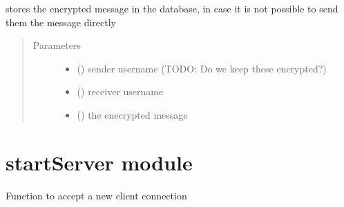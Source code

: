 \documentclass[letterpaper,10pt,english]{sphinxmanual}
\begin{document}
\begin{fulllineitems}
\label{\detokenize{db:db.storeMessageInDb}}
stores the encrypted message in the database, in case it is not possible to send them the message directly
\begin{quote}\begin{description}
\item[{Parameters}] \leavevmode\begin{itemize}
\item {} 
 () \textendash{} sender username (TODO: Do we keep these encrypted?)

\item {} 
 () \textendash{} receiver username

\item {} 
 () \textendash{} the enecrypted message

\end{itemize}

\end{description}\end{quote}

\end{fulllineitems}



\section{startServer module}
\label{\detokenize{startServer:module-startServer}}\label{\detokenize{startServer:startserver-module}}\label{\detokenize{startServer::doc}}

\begin{fulllineitems}
\label{\detokenize{startServer:startServer.accept}}
Function to accept a new client connection

\end{fulllineitems}
\end{document}
